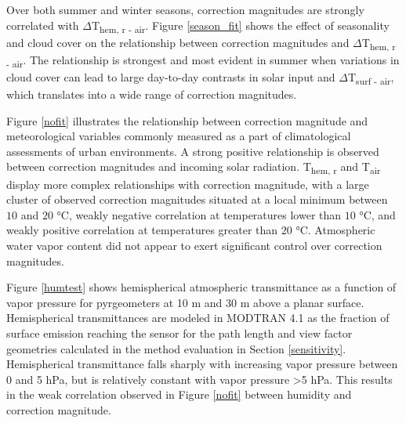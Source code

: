 Over both summer and winter seasons, correction magnitudes are strongly correlated with $\Delta$T\textsubscript{hem, r - air}. Figure \ref{season_fit} shows the effect of seasonality and cloud cover on the relationship between correction magnitudes and $\Delta$T\textsubscript{hem, r - air}. The relationship is strongest and most evident in summer when variations in cloud cover can lead to large day-to-day contrasts in solar input and $\Delta$T\textsubscript{surf - air}, which translates into a wide range of correction magnitudes.

Figure \ref{nofit} illustrates the relationship between correction magnitude and meteorological variables commonly measured as a part of climatological assessments of urban environments. A strong positive relationship is observed between correction magnitudes and incoming solar radiation. T\textsubscript{hem, r} and T\textsubscript{air} display more complex relationships with correction magnitude, with a large cluster of observed correction magnitudes situated at a local minimum between $10$ and $20$ \si{\degreeCelsius}, weakly negative correlation at temperatures lower than $10$ \si{\degreeCelsius}, and weakly positive correlation at temperatures greater than $20$ \si{\degreeCelsius}. Atmospheric water vapor content did not appear to exert significant control over correction magnitudes.

Figure \ref{humtest} shows hemispherical atmospheric transmittance as a function of vapor pressure for pyrgeometers at 10 \si{\meter} and 30 \si{\meter} above a planar surface. Hemispherical transmittances are modeled in MODTRAN 4.1 as the fraction of surface emission reaching the sensor for the path length and view factor geometries calculated in the method evaluation in Section \ref{sensitivity}. Hemispherical transmittance falls sharply with increasing vapor pressure between 0 and 5 \si{\hecto\pascal}, but is relatively constant with vapor pressure \textgreater 5 \si{\hecto\pascal}. This results in the weak correlation observed in Figure \ref{nofit} between humidity and correction magnitude.


